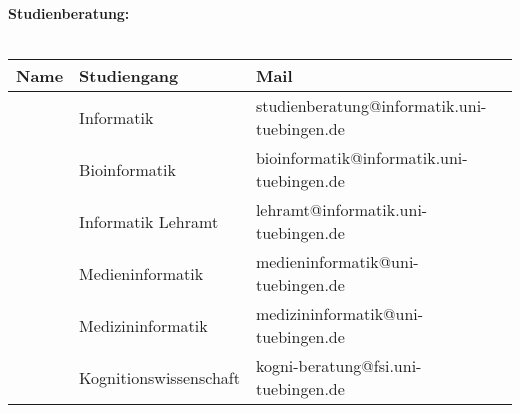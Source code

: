 \textbf{Studienberatung:}\\\\
\begin{tabular}{|lll|}
	\hline
	Name                 & Studiengang                  & Mail                                                                       \\
	\hline
	\hline
	\studBeratungInfo    & Informatik                   & studienberatung@informatik.uni-tuebingen.de\footnotemark[\value{footnote}] \\
	\studBeratungBio     & Bioinformatik                & bioinformatik@informatik.uni-tuebingen.de\footnotemark[\value{footnote}]   \\
	\studBeratungLehramt & Informatik Lehramt           & lehramt@informatik.uni-tuebingen.de\footnotemark[\value{footnote}]         \\
	\studBeratungMedien  & Medieninformatik             & medieninformatik@uni-tuebingen.de\footnotemark[\value{footnote}]           \\
	\studBeratungMedizin & Medizininformatik            & medizininformatik@uni-tuebingen.de\footnotemark[\value{footnote}]          \\
	\studBeratungKogni   & Kognitionswissenschaft       & kogni-beratung@fsi.uni-tuebingen.de\footnotemark[\value{footnote}]         \\
	\hline
\end{tabular}
\vfill
{}
\normalsize
